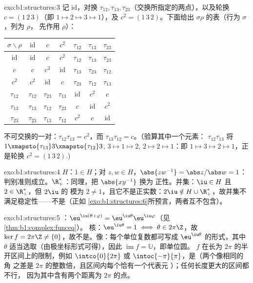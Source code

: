 \begin{solution}{exo:b1:structures:3}
记 $\mathrm{id}$，对换 $\tau_{12}, \tau_{13},
\tau_{23}$（交换所指定的两点），以及轮换 $c =
(1\,2\,3)$（即 $1 \mapsto 2 \mapsto 3 \mapsto 1$），及 $c^2 =
(1\,3\,2)$。下面给出 $\sigma\rho$ 的表（行为 $\sigma$，列为 $\rho$，
先作用 $\rho$）：
\begin{center}
\renewcommand{\arraystretch}{1.2}
\begin{tabular}{c|cccccc}
$\sigma\backslash\rho$ & $\mathrm{id}$ & $c$ & $c^2$ & $\tau_{12}$ &
$\tau_{13}$ & $\tau_{23}$ \\
\hline
$\mathrm{id}$ & $\mathrm{id}$ & $c$ & $c^2$ & $\tau_{12}$ &
$\tau_{13}$ & $\tau_{23}$ \\
$c$ & $c$ & $c^2$ & $\mathrm{id}$ & $\tau_{13}$ & $\tau_{23}$ &
$\tau_{12}$ \\
$c^2$ & $c^2$ & $\mathrm{id}$ & $c$ & $\tau_{23}$ & $\tau_{12}$ &
$\tau_{13}$ \\
$\tau_{12}$ & $\tau_{12}$ & $\tau_{23}$ & $\tau_{13}$ & $\mathrm{id}$
& $c^2$ & $c$ \\
$\tau_{13}$ & $\tau_{13}$ & $\tau_{12}$ & $\tau_{23}$ & $c$ &
$\mathrm{id}$ & $c^2$ \\
$\tau_{23}$ & $\tau_{23}$ & $\tau_{13}$ & $\tau_{12}$ & $c^2$ & $c$ &
$\mathrm{id}$ \\
\end{tabular}
\end{center}
不可交换的一对：$\tau_{12}\tau_{13} = c^2$，而
$\tau_{13}\tau_{12} = c$。（验算其中一个元素：
$\tau_{12}\tau_{13}$ 将 $1 \xmapsto{\tau_{13}} 3
\xmapsto{\tau_{12}} 3$, $3 \mapsto 1 \mapsto 2$, $2 \mapsto 2 \mapsto
1$：即 $1 \mapsto 3 \mapsto 2 \mapsto 1$，正是轮换 $c^2 =
(1\,3\,2)$.)
\end{solution}

\begin{solution}{exo:b1:structures:4}
$H$：$1 \in H$；对 $z, w \in H$，$\abs{zw^{-1}} = \abs z / \abs w =
1$：判别准则成立。$\R_+^*$：同理，把 $\abs{xy^{-1}}$ 换为
正性。并集：$\iu \in H$ 且 $2 \in \R_+^*$，但 $2\iu$ 的
模为 $2 \neq 1$，且它不是正实数：$2\iu \notin H \cup
\R_+^*$，故并集不满足稳定性——不是（正如
\cref{exo:b1:structures:6}所预言，两者互不包含）。
\end{solution}

\begin{solution}{exo:b1:structures:5}
：$\eu^{\iu(\theta + \varphi)} =
\eu^{\iu\theta}\eu^{\iu\varphi}$（见\cref{thm:b1:complex:funceq}）。
核：$\eu^{\iu\theta} = 1 \iff \theta \in 2\pi\Z$，故 $\ker f =
2\pi\Z \neq \{0\}$，故不是。像：每个单位复数都可写成
$\eu^{\iu\theta}$ 的形式，其中 $\theta$ 适当选取（由极坐标形式可得），因此
$\operatorname{im} f = \mathbb{U}$，即单位圆。
$f$ 在长为 $2\pi$ 的半开区间上的限制，例如
$\intco{0}{2\pi}$ 或 $\intoc{-\pi}{\pi}$，是（两个像相同的角
之差是 $2\pi$ 的整数倍，且区间内每个恰有一个代表元
）；任何长度更大的区间都不行，
因为其中含有两个距离为
$2\pi$ 的点。
\end{solution}

